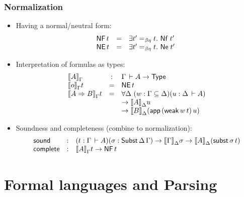 \documentclass[t,fleqn,usenames,dvipsnames]{beamer}
\begin{document}
\begin{frame}%
  \frametitle{Normalization}
  \vspace{-3ex}
  \begin{itemize}
  \item Having a normal/neutral form:
\[
  \begin{array}{lcl}
\mathsf{NF}\,t & = & \exists t' =_{\beta\eta} t.\ \mathsf{Nf}\;t'\;\\
\mathsf{NE}\,t & = & \exists t' =_{\beta\eta} t.\ \mathsf{Ne}\;t'\;\\
  \end{array}
\]
  \item Interpretation of formulas as types:
\[
  \begin{array}{lcl}
    \mathopen{{[\kern-0.14em[}} A \mathclose{{]\kern-0.14em]}}_{\Gamma} & : & \Gamma \,\vdash A \to \mathsf{Type}_{} \\
    \mathopen{{[\kern-0.14em[}} o \mathclose{{]\kern-0.14em]}}_{\Gamma} t & = & \mathsf{NE}\,t \\
    \mathopen{{[\kern-0.14em[}} A \Rightarrow B \mathclose{{]\kern-0.14em]}}_{\Gamma} t & = &
      \forall \Delta \
        (w : \Gamma \subseteq \Delta)
        (u : \Delta \,\vdash A)
     \\ && \to \mathopen{{[\kern-0.14em[}} A \mathclose{{]\kern-0.14em]}}_{\Delta} u
     \\ && \to \mathopen{{[\kern-0.14em[}} B \mathclose{{]\kern-0.14em]}}_{\Delta} (\mathsf{app}\,(\mathsf{weak}\,w\,t)\,u)
  \end{array}
\]
  \item Soundness and completeness (combine to normalization):
\[
  \begin{array}{lcl}
    \mathsf{sound} & : & (t : \Gamma \,\vdash A) (\sigma : \mathsf{Subst}\,\Delta\,\Gamma)
       \to \mathopen{{[\kern-0.14em[}} \Gamma \mathclose{{]\kern-0.14em]}}_{\Delta} \sigma \to \mathopen{{[\kern-0.14em[}} A \mathclose{{]\kern-0.14em]}}_{\Delta} (\mathsf{subst}\,\sigma\,t)
    \\
    \mathsf{complete} & : & \mathopen{{[\kern-0.14em[}} A \mathclose{{]\kern-0.14em]}}_{\Gamma} t \to \mathsf{NF}\, t \\
  \end{array}
\]
  \end{itemize}
\end{frame}

\section{Formal languages and Parsing}

\newcommand{\Ge}{\varepsilon}
\newcommand{\tred}{\mathsf{red}}
\renewcommand{\ttm}{\mathsf{tm}}
\newcommand{\tnt}{\mathsf{nt}}
\end{document}
